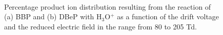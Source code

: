 \begin{figure}[htbp]%
\centering
{}\\
\caption{Percentage product ion distribution resulting from the reaction of (a) BBP and (b) DBeP with H$_3$O$^+$ as a function of the drift voltage and the reduced electric field in the range from 80 to 205 Td.}
\label{fig:PH_BBP_DBeP_fs}
\end{figure}


